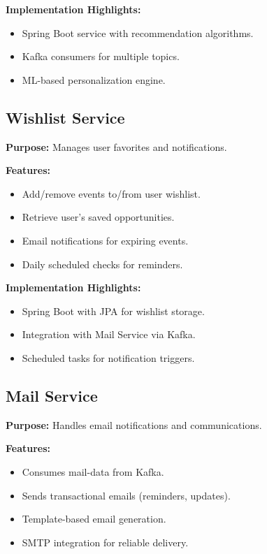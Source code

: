 \documentclass[12pt,a4paper]{report}
\begin{document}
\textbf{Implementation Highlights:}
\begin{itemize}
    \item Spring Boot service with recommendation algorithms.
    \item Kafka consumers for multiple topics.
    \item ML-based personalization engine.
\end{itemize}

\subsection{Wishlist Service}

\textbf{Purpose:} Manages user favorites and notifications.

\textbf{Features:}
\begin{itemize}
    \item Add/remove events to/from user wishlist.
    \item Retrieve user's saved opportunities.
    \item Email notifications for expiring events.
    \item Daily scheduled checks for reminders.
\end{itemize}

\textbf{Implementation Highlights:}
\begin{itemize}
    \item Spring Boot with JPA for wishlist storage.
    \item Integration with Mail Service via Kafka.
    \item Scheduled tasks for notification triggers.
\end{itemize} 

\subsection{Mail Service}

\textbf{Purpose:} Handles email notifications and communications.

\textbf{Features:}
\begin{itemize}
    \item Consumes mail-data from Kafka.
    \item Sends transactional emails (reminders, updates).
    \item Template-based email generation.
    \item SMTP integration for reliable delivery.
\end{itemize}
\end{document}
